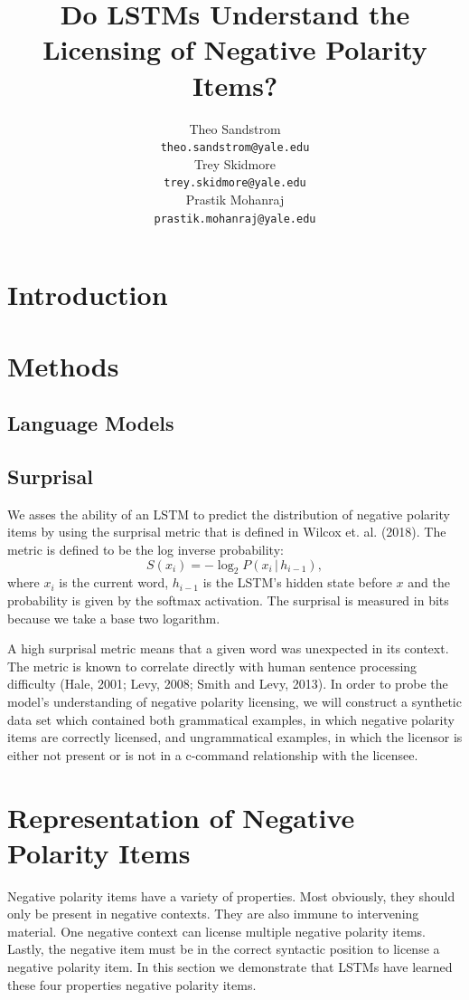 \documentclass[11pt]{article}
\title{Do LSTMs Understand the Licensing of Negative Polarity Items?}
\author{Theo Sandstrom \\
  \texttt{theo.sandstrom@yale.edu} \\
  Trey Skidmore \\
  \texttt{trey.skidmore@yale.edu} \\
  Prastik Mohanraj \\
  \texttt{prastik.mohanraj@yale.edu}}
\begin{document}
\maketitle
\begin{abstract}

\end{abstract}

\section{Introduction}

\section{Methods}
\subsection{Language Models}
\subsection{Surprisal}
We asses the ability of an LSTM to predict the distribution of negative polarity items by using the surprisal metric that is defined in Wilcox et. al. (2018). The metric is defined to be the log inverse probability:
\[S(x_i) = -\log_2 P(x_i\,|\,h_{i-1}),\]
where $x_i$ is the current word, $h_{i-1}$ is the LSTM's hidden state before $x$ and the probability is given by the softmax activation. The surprisal is measured in bits because we take a base two logarithm.

A high surprisal metric means that a given word was unexpected in its context. The metric is known to correlate directly with human sentence processing difficulty (Hale, 2001; Levy, 2008; Smith and Levy, 2013). In order to probe the model’s understanding of negative polarity licensing, we will construct a synthetic data set which contained both grammatical examples, in which negative polarity items are correctly licensed, and ungrammatical examples, in which the licensor is either not present or is not in a c-command relationship with the licensee.


\section{Representation of Negative Polarity Items}
Negative polarity items have a variety of properties. Most obviously, they should only be present in negative contexts. They are also immune to intervening material. One negative context can license multiple negative polarity items. Lastly, the negative item must be in the correct syntactic position to license a negative polarity item. In this section we demonstrate that LSTMs have learned these four properties negative polarity items.
\end{document}
